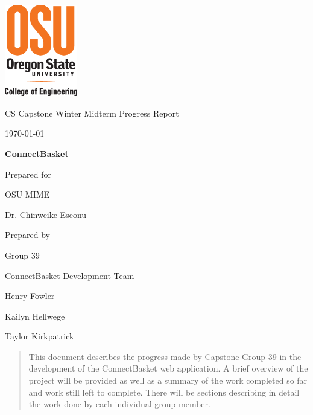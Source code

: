 \documentclass[onecolumn, draftclsnofoot,10pt, compsoc]{IEEEtran}
\def \CapstoneTeamName{		ConnectBasket Development Team}
\def \CapstoneTeamNumber{		39}
\def \GroupMemberOne{			Henry Fowler}
\def \GroupMemberTwo{			Kailyn Hellwege}
\def \GroupMemberThree{			Taylor Kirkpatrick}
\def \CapstoneProjectName{		ConnectBasket}
\def \CapstoneSponsorCompany{	OSU MIME}
\def \CapstoneSponsorPerson{		Dr. Chinweike Eseonu}
\def \DocType{		%
				Winter Midterm Progress Report
				}
\newcommand{\NameSigPair}[1]{\par
\makebox[2.75in][r]{#1} \hfil 	\makebox[3.25in]{\makebox[2.25in]{\hrulefill} \hfill		\makebox[.75in]{\hrulefill}}
\par\vspace{-12pt} \textit{\tiny\noindent
\makebox[2.75in]{} \hfil		\makebox[3.25in]{\makebox[2.25in][r]{Signature} \hfill	\makebox[.75in][r]{Date}}}}
\renewcommand{\NameSigPair}[1]{#1}
\begin{document}
\begin{titlepage}
    \begin{singlespace}
    	\includegraphics[height=4cm]{coe_v_spot1}
        \hfill 
        \par\vspace{.2in}
        \centering
        \scshape{
            \huge CS Capstone \DocType \par
            {\large\today}\par
            \vspace{.5in}
            \textbf{\Huge\CapstoneProjectName}\par
            \vfill
            {\large Prepared for}\par
            \Huge \CapstoneSponsorCompany\par
            \vspace{5pt}
            {\Large\NameSigPair{\CapstoneSponsorPerson}\par}
            {\large Prepared by }\par
            Group\CapstoneTeamNumber\par
            \CapstoneTeamName\par 
            \vspace{5pt}
            {\Large
                \NameSigPair{\GroupMemberOne}\par
                \NameSigPair{\GroupMemberTwo}\par
                \NameSigPair{\GroupMemberThree}\par
            }
            \vspace{20pt}
        }
        \begin{abstract}
        This document describes the progress made by Capstone Group 39 in the development of the ConnectBasket web application. A brief overview of the project will be provided as well as a summary of the work completed so far and work still left to complete. There will be sections describing in detail the work done by each individual group member.

        \end{abstract}     
    \end{singlespace}
\end{titlepage}
\newpage
{}
\tableofcontents
\clearpage
\end{document}
